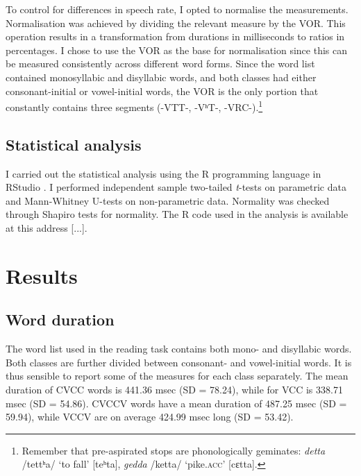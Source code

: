 \documentclass[11pt,a4paper,openany]{memoir}\usepackage[]{graphicx}\usepackage[]{color}
\begin{document}
To control for differences in speech rate, I opted to normalise the measurements.
Normalisation was achieved by dividing the relevant measure by the VOR.
This operation results in a transformation from durations in milliseconds to ratios in percentages.
I chose to use the VOR as the base for normalisation since this can be measured consistently across different word forms.
Since the word list contained monosyllabic and disyllabic words, and both classes had either consonant-initial or vowel-initial words, the VOR is the only portion that constantly contains three segments (-VTT-, -VʰT-, -VRC-).\footnote{Remember that pre-aspirated stops are phonologically geminates: \textit{detta} /tettʰa/ `to fall' [teʰta], \textit{gedda} /ketta/ `pike.\textsc{acc}' [cɛtta].}

\section{Statistical analysis}
\label{s:stats}
I carried out the statistical analysis using the R programming language \citep{r-core-team2015} in RStudio \citep{rstudio-team2015}.
I performed independent sample two-tailed \textit{t}-tests on parametric data and Mann-Whitney U-tests on non-parametric data.
Normality was checked through Shapiro tests for normality.
The R code used in the analysis is available at this address [...].













\chapter{Results}
\label{c:results}

\section{Word duration}

The word list used in the reading task contains both mono- and disyllabic words.
Both classes are further divided between consonant- and vowel-initial words.
It is thus sensible to report some of the measures for each class separately.
The mean duration of CVCC words is 441.36 msec (SD = 78.24), while for VCC is 338.71 msec (SD = 54.86).
CVCCV words have a mean duration of 487.25 msec (SD = 59.94), while VCCV are on average 424.99 msec long (SD = 53.42).
\end{document}
